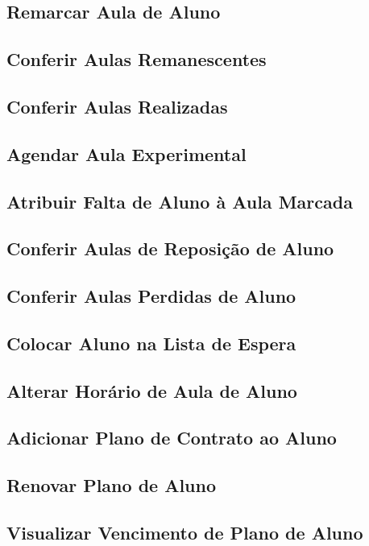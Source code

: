 \subsection[Remarcar Aula de Aluno]{Remarcar Aula de Aluno}
\subsection[Conferir Aulas Remanescentes]{Conferir Aulas Remanescentes}
\subsection[Conferir Aulas Realizadas]{Conferir Aulas Realizadas}
\subsection[Agendar Aula Experimental]{Agendar Aula Experimental}
\subsection[Atribuir Falta de Aluno à Aula Marcada]{Atribuir Falta de Aluno à Aula Marcada}
\subsection[Conferir Aulas de Reposição de Aluno]{Conferir Aulas de Reposição de Aluno}
\subsection[Conferir Aulas Perdidas de Aluno]{Conferir Aulas Perdidas de Aluno}
\subsection[Colocar Aluno na Lista de Espera]{Colocar Aluno na Lista de Espera}
\subsection[Alterar Horário de Aula de Aluno]{Alterar Horário de Aula de Aluno}
\subsection[Adicionar Plano de Contrato ao Aluno]{Adicionar Plano de Contrato ao Aluno}
\subsection[Renovar Plano de Aluno]{Renovar Plano de Aluno}
\subsection[Visualizar Vencimento de Plano de Aluno]{Visualizar Vencimento de Plano de Aluno}
